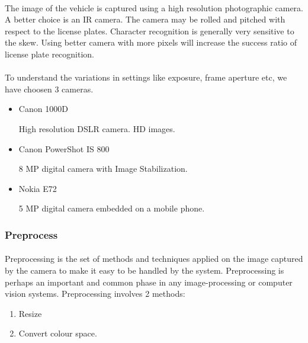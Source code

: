 \documentclass[a4paper,10pt]{iesreport}
\begin{document}
\paragraph*{}
The image of the vehicle is captured using a high resolution photographic camera. A better choice is an IR camera.
The camera may be rolled and pitched with respect to the license plates. Character recognition is generally very sensitive to the skew. Using better camera with more pixels will increase the success ratio of license plate recognition. 
\paragraph*{}
To understand the variations in settings like exposure, frame aperture etc, we have choosen 3 cameras. 
\begin{itemize}
 \item Canon 1000D
\begin{description}
 \item[High resolution DSLR camera. HD images.]
 \end{description}
 \item Canon PowerShot IS 800
\begin{description}
 \item[8 MP digital camera with Image Stabilization.]
 \end{description}
 \item Nokia E72
\begin{description}
 \item[5 MP digital camera embedded on a mobile phone.]
\end{description}
\end{itemize}

\subsubsection{Preprocess}
\paragraph*{}
Preprocessing is the set of methods and techniques applied on the image captured by the camera to make it easy to be handled by the system. Preprocessing is perhaps an important and common phase in any image-processing or computer vision systems.
Preprocessing involves 2 methods:
\begin{enumerate}
 \item Resize 
 \item Convert colour space.
\end{enumerate}
\end{document}

